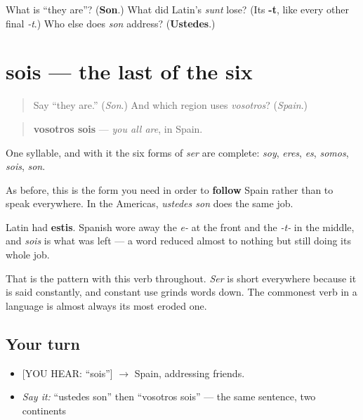 \begin{tcolorbox}[breakable,colback=teal!4,colframe=teal!35!black,title={Before you move on}]
What is \textquotedblleft{}they are\textquotedblright{}? (\textbf{Son}.) What did Latin's \emph{sunt} lose? (Its \textbf{-t}, like every other final \emph{-t}.) Who else does \emph{son} address? (\textbf{Ustedes}.)
\end{tcolorbox}
\section[sois]{sois — the last of the six}

\label{lesson:ES-C09-sois}



\begin{quote}
Say \textquotedblleft{}they are.\textquotedblright{} (\emph{Son}.) And which region uses \emph{vosotros}? (\emph{Spain}.)
\end{quote}

\begin{grammarlens}[title={Grammar Lens: one syllable, and the paradigm closes}]
\begin{quote}
\textbf{vosotros sois} — \emph{you all are}, in Spain.
\end{quote}

One syllable, and with it the six forms of \emph{ser} are complete: \emph{soy}, \emph{eres}, \emph{es}, \emph{somos}, \emph{sois}, \emph{son}.

As before, this is the form you need in order to \textbf{follow} Spain rather than to speak everywhere. In the Americas, \emph{ustedes son} does the same job.
\end{grammarlens}

\begin{cousinweb}
Latin had \textbf{estis}. Spanish wore away the \emph{e-} at the front and the \emph{-t-} in the middle, and \emph{sois} is what was left — a word reduced almost to nothing but still doing its whole job.

That is the pattern with this verb throughout. \emph{Ser} is short everywhere because it is said constantly, and constant use grinds words down. The commonest verb in a language is almost always its most eroded one.
\end{cousinweb}

\subsection*{Your turn}
\begin{itemize}
\raggedright
  \item {[}YOU HEAR: \textquotedblleft{}sois\textquotedblright{}{]} $\to$ Spain, addressing friends.
  \item \emph{Say it:} \textquotedblleft{}ustedes son\textquotedblright{} then \textquotedblleft{}vosotros sois\textquotedblright{} — the same sentence, two continents
\end{itemize}

